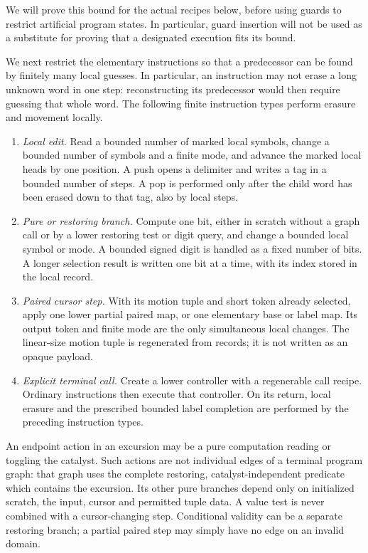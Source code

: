 We will prove this bound for the actual recipes below, before using
guards to restrict artificial program states.  In particular, guard
insertion will not be used as a substitute for proving that a designated
execution fits its bound.

We next restrict the elementary instructions so that a predecessor can be found by finitely many local guesses. In particular, an instruction may not erase a long unknown word in one step: reconstructing its predecessor would then require guessing that whole word. The following finite instruction types perform erasure and movement locally.
\begin{enumerate}
\item \emph{Local edit.} Read a bounded number of marked local symbols,
  change a bounded number of symbols and a finite mode, and advance the
  marked local heads by one position.  A push opens a delimiter and
  writes a tag in a bounded number of steps.  A pop is performed only
  after the child word has been erased down to that tag, also by local
  steps.
\item \emph{Pure or restoring branch.} Compute one bit, either in scratch
  without a graph call or by a lower restoring test or digit query, and
  change a bounded local symbol or mode.  A bounded signed digit is
  handled as a fixed number of bits.  A longer selection result is
  written one bit at a time, with its index stored in the local record.
\item \emph{Paired cursor step.} With its motion tuple and short token
  already selected, apply one lower partial paired map, or one elementary
  base or label map.  Its output token and finite mode are the only
  simultaneous local changes.  The linear-size motion tuple is
  regenerated from records; it is not written as an opaque payload.
\item \emph{Explicit terminal call.} Create a lower controller with a
  regenerable call recipe.  Ordinary instructions then execute that
  controller.  On its return, local erasure and the prescribed bounded
  label completion are performed by the preceding instruction types.
\end{enumerate}
An endpoint action in an excursion may be a pure computation reading or
toggling the catalyst.  Such actions are not individual edges of a
terminal program graph: that graph uses the complete restoring,
catalyst-independent predicate which contains the excursion.  Its other
pure branches depend only on initialized scratch, the input, cursor and
permitted tuple data.  A value test is never combined with a cursor-changing
step.  Conditional validity can be a separate restoring branch; a
partial paired step may simply have no edge on an invalid domain.

